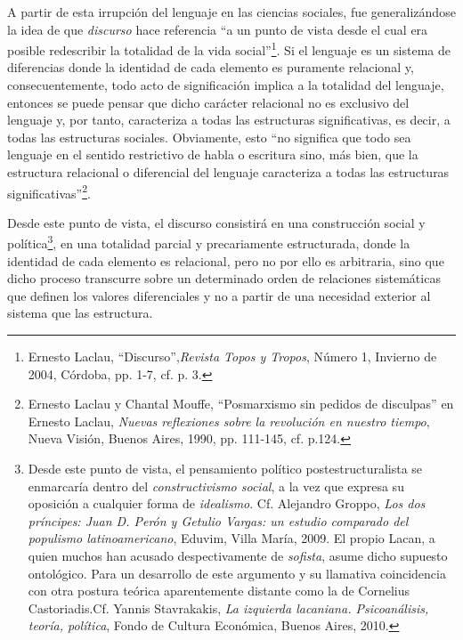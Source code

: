 A partir de esta irrupción del lenguaje en las ciencias sociales, fue
generalizándose la idea de que \emph{discurso} hace referencia \enquote{a un
punto de vista desde el cual era posible redescribir la totalidad de la
vida social}\footnote{Ernesto Laclau, \enquote{Discurso},\emph{Revista Topos y
  Tropos}, Número 1, Invierno de 2004, Córdoba, pp. 1-7, cf. p. 3.}. Si
el lenguaje es un sistema de diferencias donde la identidad de cada
elemento es puramente relacional y, consecuentemente, todo acto de
significación implica a la totalidad del lenguaje, entonces se puede
pensar que dicho carácter relacional no es exclusivo del lenguaje y, por
tanto, caracteriza a todas las estructuras significativas, es decir, a
todas las estructuras sociales. Obviamente, esto \enquote{no significa que todo
sea lenguaje en el sentido restrictivo de habla o escritura sino, más
bien, que la estructura relacional o diferencial del lenguaje
caracteriza a todas las estructuras significativas}\footnote{Ernesto
  Laclau y Chantal Mouffe, \enquote{Posmarxismo sin pedidos de disculpas} en
  Ernesto Laclau, \emph{Nuevas reflexiones sobre la revolución en
  nuestro tiempo}, Nueva Visión, Buenos Aires, 1990, pp. 111-145, cf.
  p.124.}.

Desde este punto de vista, el discurso consistirá en una construcción
social y política\footnote{Desde este punto de vista, el pensamiento
  político postestructuralista se enmarcaría dentro del
  \emph{constructivismo social}, a la vez que expresa su oposición a
  cualquier forma de \emph{idealismo}. Cf. Alejandro Groppo, \emph{Los
  dos príncipes: Juan D. Perón y Getulio Vargas: un estudio comparado
  del populismo latinoamericano}, Eduvim, Villa María, 2009. El propio
  Lacan, a quien muchos han acusado despectivamente de \emph{sofista},
  asume dicho supuesto ontológico. Para un desarrollo de este argumento
  y su llamativa coincidencia con otra postura teórica aparentemente
  distante como la de Cornelius Castoriadis.Cf. Yannis Stavrakakis,
  \emph{La izquierda lacaniana. Psicoanálisis, teoría, política}, Fondo
  de Cultura Económica, Buenos Aires, 2010.}, en una totalidad parcial y
precariamente estructurada, donde la identidad de cada elemento es
relacional, pero no por ello es arbitraria, sino que dicho proceso
transcurre sobre un determinado orden de relaciones sistemáticas que
definen los valores diferenciales y no a partir de una necesidad
exterior al sistema que las estructura.

